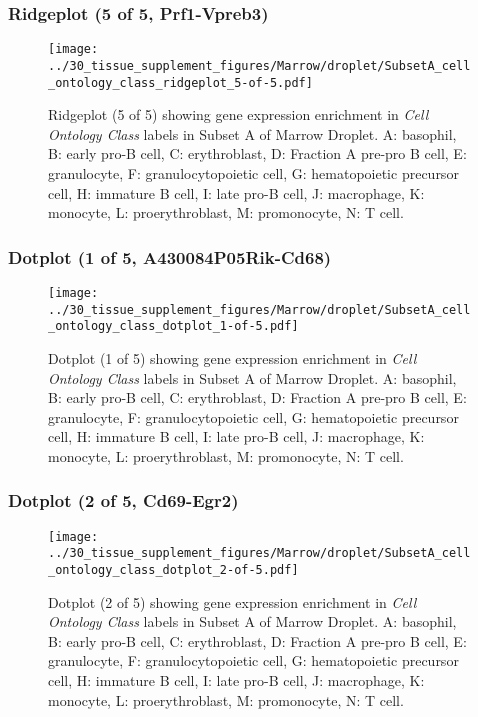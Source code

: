 \clearpage

\subsubsection{Ridgeplot (5 of 5, Prf1-Vpreb3)}
\begin{figure}[h]
\centering
\texttt{[image: ../30\_tissue\_supplement\_figures/Marrow/droplet/SubsetA\_cell\_ontology\_class\_ridgeplot\_5-of-5.pdf]}

\caption{ Ridgeplot (5 of 5)  showing gene expression enrichment in \emph{Cell Ontology Class} labels in Subset A of Marrow Droplet. A: basophil, B: early pro-B cell, C: erythroblast, D: Fraction A pre-pro B cell, E: granulocyte, F: granulocytopoietic cell, G: hematopoietic precursor cell, H: immature B cell, I: late pro-B cell, J: macrophage, K: monocyte, L: proerythroblast, M: promonocyte, N: T cell.}
\end{figure}


\clearpage

\subsubsection{Dotplot (1 of 5, A430084P05Rik-Cd68)}
\begin{figure}[h]
\centering
\texttt{[image: ../30\_tissue\_supplement\_figures/Marrow/droplet/SubsetA\_cell\_ontology\_class\_dotplot\_1-of-5.pdf]}

\caption{ Dotplot (1 of 5)  showing gene expression enrichment in \emph{Cell Ontology Class} labels in Subset A of Marrow Droplet. A: basophil, B: early pro-B cell, C: erythroblast, D: Fraction A pre-pro B cell, E: granulocyte, F: granulocytopoietic cell, G: hematopoietic precursor cell, H: immature B cell, I: late pro-B cell, J: macrophage, K: monocyte, L: proerythroblast, M: promonocyte, N: T cell.}
\end{figure}


\clearpage

\subsubsection{Dotplot (2 of 5, Cd69-Egr2)}
\begin{figure}[h]
\centering
\texttt{[image: ../30\_tissue\_supplement\_figures/Marrow/droplet/SubsetA\_cell\_ontology\_class\_dotplot\_2-of-5.pdf]}

\caption{ Dotplot (2 of 5)  showing gene expression enrichment in \emph{Cell Ontology Class} labels in Subset A of Marrow Droplet. A: basophil, B: early pro-B cell, C: erythroblast, D: Fraction A pre-pro B cell, E: granulocyte, F: granulocytopoietic cell, G: hematopoietic precursor cell, H: immature B cell, I: late pro-B cell, J: macrophage, K: monocyte, L: proerythroblast, M: promonocyte, N: T cell.}
\end{figure}


